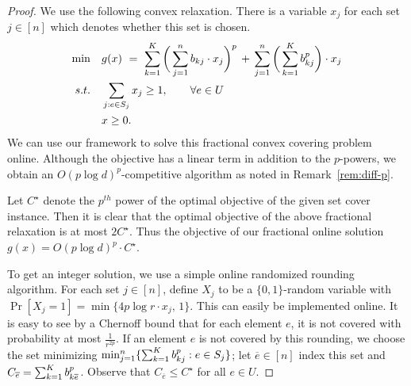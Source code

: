\documentclass[letterpaper,11pt]{article}
\begin{document}
\begin{proof}
  We use the following convex relaxation. There is a variable $x_j$ for
  each set $j\in [n]$ which denotes whether this set is chosen.
  \begin{alignat*}{2}
    \min & \quad g(x) \,\,=\,\, \sum_{k=1}^{K}\bigg( \sum_{j=1}^n
    b_{kj}\cdot x_j \bigg)^p
    \,+\, \sum_{j=1}^n \bigg(\sum_{k=1}^K b_{kj}^p\bigg)\cdot x_j \\
    s.t. & \quad \sum_{j : e\in S_j} x_j  \geq 1, \qquad \forall e \in U\\
    &\quad x \geq 0.
  \end{alignat*}
  We can use our framework to solve this fractional convex covering
  problem online. Although the objective has a linear term in addition
  to the $p$-powers, we obtain an $O(p\log d)^p$-competitive algorithm as noted in Remark~\ref{rem:diff-p}.

Let $C^\star$ denote the $p^{th}$
  power of the optimal objective of the given set cover instance. Then
  it is clear that the optimal objective of the above fractional
  relaxation is at most $2C^\star$. Thus the objective of our fractional online
  solution $g(x)= O(p\log d)^p\cdot C^\star$.

\def\oe{{\overline{e}}}

  To get an integer solution, we use a simple online randomized rounding
  algorithm. For each set $j\in [n]$, define $X_j$ to be a
  $\{0,1\}$-random variable with $\Pr[X_j=1]=\min\{4p\log r\cdot x_j,\,
  1\}$. This can easily be implemented online. It is easy to see by a
  Chernoff bound that for each element $e$, it is not covered with
  probability at most $\frac{1}{r^{2p}}$. If an element $e$ is not covered by this rounding, we choose the set minimizing $\min_{j=1}^n \{\sum_{k=1}^K b_{kj}^p : e\in S_j\}$; let $\oe\in [n]$ index this set and $C_\oe=\sum_{k=1}^K \b_{k\oe}^p$. Observe that $C_\oe\le C^\star$ for all $e\in U$.



\end{proof}
\end{document}
